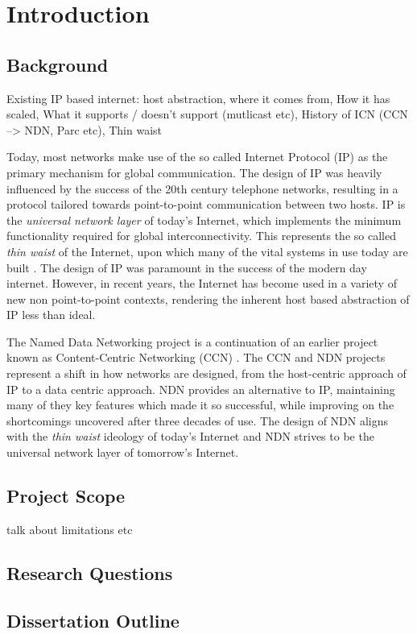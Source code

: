 \chapter{Introduction}
\section{Background}
Existing IP based internet: host abstraction, where it comes from, How it has scaled, What it supports / doesn't support (mutlicast etc), History of ICN (CCN --> NDN, Parc etc), Thin waist


Today, most networks make use of the so called Internet Protocol (IP) as the primary mechanism for global communication. The design of IP was heavily influenced by the success of the 20th century telephone networks, resulting in a protocol tailored towards point-to-point communication between two hosts. IP is the \textit{universal network layer} of today's Internet, which implements the minimum functionality required for global interconnectivity. This represents the so called \textit{thin waist} of the Internet, upon which many of the vital systems in use today are built \cite{ndn-exec-summary}. The design of IP was paramount in the success of the modern day internet. However, in recent years, the Internet has become used in a variety of new non point-to-point contexts, rendering the inherent host based abstraction of IP less than ideal.  

The Named Data Networking project is a continuation of an earlier project known as Content-Centric Networking (CCN) \cite{vj-named-content}. The CCN and NDN projects represent a shift in how networks are designed, from the host-centric approach of IP to a data centric approach. NDN provides an alternative to IP, maintaining many of they key features which made it so successful, while improving on the shortcomings uncovered after three decades of use. The design of NDN aligns with the \textit{thin waist} ideology of today's Internet and NDN strives to be the universal network layer of tomorrow's Internet. 





\section{Project Scope}
talk about limitations etc

\section{Research Questions}

\section{Dissertation Outline}